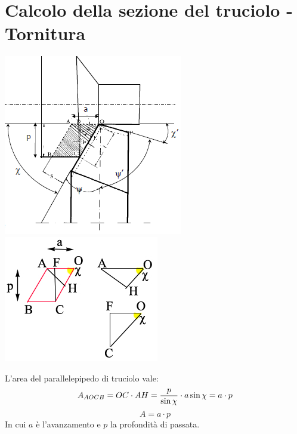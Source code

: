 \documentclass[a4paper, 15pt]{article}
\begin{document}
 \section{Calcolo della sezione del truciolo - Tornitura}
\begin{center}
	\includegraphics[width=0.3\linewidth]{figures/asp12}
	\includegraphics[width=0.3\linewidth]{figures/asp13}
\end{center}
	L'area del parallelepipedo di truciolo vale:
	\[A_{AOCB} = OC\cdot AH = {p\over\sin\chi}\cdot a\sin\chi = a\cdot p\]
	\begin{equation}\label{eq:21}
		\boxed{A = a\cdot p}
	\end{equation}
	In cui $a$ è l'avanzamento e $p$ la profondità di passata.
\end{document}
